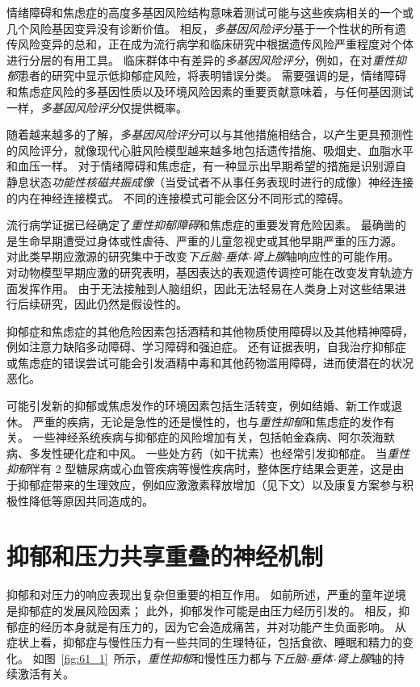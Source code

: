 情绪障碍和焦虑症的高度多基因风险结构意味着测试可能与这些疾病相关的一个或几个风险基因变异没有诊断价值。
相反，\textit{多基因风险评分}基于一个性状的所有遗传风险变异的总和，正在成为流行病学和临床研究中根据遗传风险严重程度对个体进行分层的有用工具。
临床群体中有差异的\textit{多基因风险评分}，例如，在对\textit{重性抑郁}患者的研究中显示低抑郁症风险，将表明错误分类。
需要强调的是，情绪障碍和焦虑症风险的多基因性质以及环境风险因素的重要贡献意味着，与任何基因测试一样，\textit{多基因风险评分}仅提供概率。


随着越来越多的了解，\textit{多基因风险评分}可以与其他措施相结合，以产生更具预测性的风险评分，就像现代心脏风险模型越来越多地包括遗传措施、吸烟史、血脂水平和血压一样。
对于情绪障碍和焦虑症，有一种显示出早期希望的措施是识别源自静息状态\textit{功能性核磁共振成像}（当受试者不从事任务表现时进行的成像）神经连接的内在神经连接模式。
不同的连接模式可能会区分不同形式的障碍。


流行病学证据已经确定了\textit{重性抑郁障碍}和焦虑症的重要发育危险因素。
最确凿的是生命早期遭受过身体或性虐待、严重的儿童忽视史或其他早期严重的压力源。
对此类早期应激源的研究集中于改变\textit{下丘脑-垂体-肾上腺}轴响应性的可能作用。
对动物模型早期应激的研究表明，基因表达的表观遗传调控可能在改变发育轨迹方面发挥作用。
由于无法接触到人脑组织，因此无法轻易在人类身上对这些结果进行后续研究，因此仍然是假设性的。


抑郁症和焦虑症的其他危险因素包括酒精和其他物质使用障碍以及其他精神障碍，例如注意力缺陷多动障碍、学习障碍和强迫症。
还有证据表明，自我治疗抑郁症或焦虑症的错误尝试可能会引发酒精中毒和其他药物滥用障碍，进而使潜在的状况恶化。


可能引发新的抑郁或焦虑发作的环境因素包括生活转变，例如结婚、新工作或退休。
严重的疾病，无论是急性的还是慢性的，也与\textit{重性抑郁}和焦虑症的发作有关。
一些神经系统疾病与抑郁症的风险增加有关，包括帕金森病、阿尔茨海默病、多发性硬化症和中风。
一些处方药（如干扰素）也经常引发抑郁症。
当\textit{重性抑郁}伴有 2 型糖尿病或心血管疾病等慢性疾病时，整体医疗结果会更差，这是由于抑郁症带来的生理效应，例如应激激素释放增加（见下文）以及康复方案参与积极性降低等原因共同造成的。



\section{抑郁和压力共享重叠的神经机制}

抑郁和对压力的响应表现出复杂但重要的相互作用。
如前所述，严重的童年逆境是抑郁症的发展风险因素；
此外，抑郁发作可能是由压力经历引发的。
相反，抑郁症的经历本身就是有压力的，因为它会造成痛苦，并对功能产生负面影响。
从症状上看，抑郁症与慢性压力有一些共同的生理特征，包括食欲、睡眠和精力的变化。
如图~\ref{fig:61_1}~所示，\textit{重性抑郁}和慢性压力都与\textit{下丘脑-垂体-肾上腺}轴的持续激活有关。


